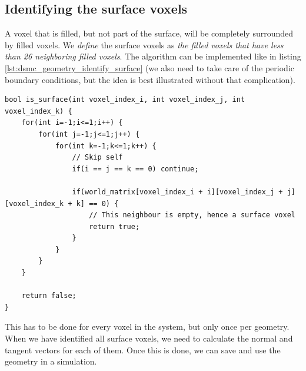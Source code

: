 \subsection{Identifying the surface voxels}
A voxel that is filled, but not part of the surface, will be completely surrounded by filled voxels. We \textit{define} the surface voxels as \textit{the filled voxels that have less than 26 neighboring filled voxels}. The algorithm can be implemented like in listing \ref{lst:dsmc_geometry_identify_surface} (we also need to take care of the periodic boundary conditions, but the idea is best illustrated without that complication).
\begin{lstlisting}[caption=An example showing how to identify the surface voxels. The world\_matrix contains all the voxel values (zeros and ones)., label=lst:dsmc_geometry_identify_surface]
bool is_surface(int voxel_index_i, int voxel_index_j, int voxel_index_k) {
	for(int i=-1;i<=1;i++) {
    	for(int j=-1;j<=1;j++) {
			for(int k=-1;k<=1;k++) {
				// Skip self
				if(i == j == k == 0) continue; 

                if(world_matrix[voxel_index_i + i][voxel_index_j + j][voxel_index_k + k] == 0) {
                	// This neighbour is empty, hence a surface voxel
                	return true;
                }
            }
        }
    }

    return false;
}
\end{lstlisting}
This has to be done for every voxel in the system, but only once per geometry. When we have identified all surface voxels, we need to calculate the normal and tangent vectors for each of them. Once this is done, we can save and use the geometry in a simulation.
